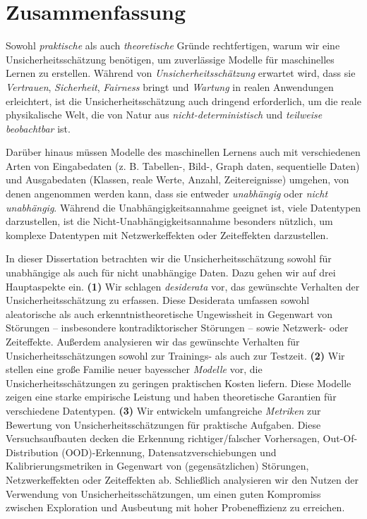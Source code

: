 \chapter*{Zusammenfassung}
%

Sowohl \emph{praktische} als auch \emph{theoretische} Gründe rechtfertigen, warum wir eine Unsicherheitsschätzung benötigen, um zuverlässige Modelle für maschinelles Lernen zu erstellen. Während von \emph{Unsicherheitsschätzung} erwartet wird, dass sie \emph{Vertrauen}, \emph{Sicherheit}, \emph{Fairness} bringt und \emph{Wartung} in realen Anwendungen erleichtert, ist die Unsicherheitsschätzung auch dringend erforderlich, um die reale physikalische Welt, die von Natur aus \emph{nicht-deterministisch} und \emph{teilweise beobachtbar} ist.

Darüber hinaus müssen Modelle des maschinellen Lernens auch mit verschiedenen Arten von Eingabedaten (z. B. Tabellen-, Bild-, Graph daten, sequentielle Daten) und Ausgabedaten (Klassen, reale Werte, Anzahl, Zeitereignisse) umgehen, von denen angenommen werden kann, dass sie entweder \emph{unabhängig} oder \emph{nicht unabhängig}. Während die Unabhängigkeitsannahme geeignet ist, viele Datentypen darzustellen, ist die Nicht-Unabhängigkeitsannahme besonders nützlich, um komplexe Datentypen mit Netzwerkeffekten oder Zeiteffekten darzustellen.

In dieser Dissertation betrachten wir die Unsicherheitsschätzung sowohl für unabhängige als auch für nicht unabhängige Daten. Dazu gehen wir auf drei Hauptaspekte ein. \textbf{(1)} Wir schlagen \emph{desiderata} vor, das gewünschte Verhalten der Unsicherheitsschätzung zu erfassen. Diese Desiderata umfassen sowohl aleatorische als auch erkenntnistheoretische Ungewissheit in Gegenwart von Störungen -- insbesondere kontradiktorischer Störungen -- sowie Netzwerk- oder Zeiteffekte. Außerdem analysieren wir das gewünschte Verhalten für Unsicherheitsschätzungen sowohl zur Trainings- als auch zur Testzeit. \textbf{(2)} Wir stellen eine große Familie neuer bayesscher \emph{Modelle} vor, die Unsicherheitsschätzungen zu geringen praktischen Kosten liefern. Diese Modelle zeigen eine starke empirische Leistung und haben theoretische Garantien für verschiedene Datentypen. \textbf{(3)} Wir entwickeln umfangreiche \emph{Metriken} zur Bewertung von Unsicherheitsschätzungen für praktische Aufgaben. Diese Versuchsaufbauten decken die Erkennung richtiger/falscher Vorhersagen, Out-Of-Distribution (OOD)-Erkennung, Datensatzverschiebungen und Kalibrierungsmetriken in Gegenwart von (gegensätzlichen) Störungen, Netzwerkeffekten oder Zeiteffekten ab. Schließlich analysieren wir den Nutzen der Verwendung von Unsicherheitsschätzungen, um einen guten Kompromiss zwischen Exploration und Ausbeutung mit hoher Probeneffizienz zu erreichen.